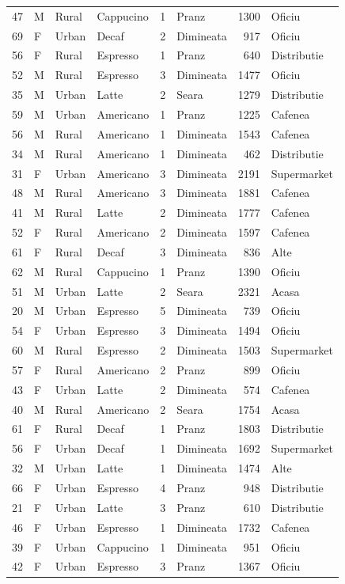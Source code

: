 \documentclass[12pt,a4paper]{report}
\begin{document}
\begin{appendices}
\begin{longtable}{rlllrlrl}
47 & M & Rural & Cappucino & 1 & Pranz & 1300 & Oficiu \\
69 & F & Urban & Decaf & 2 & Dimineata & 917 & Oficiu \\
56 & F & Rural & Espresso & 1 & Pranz & 640 & Distributie \\
52 & M & Rural & Espresso & 3 & Dimineata & 1477 & Oficiu \\
35 & M & Urban & Latte & 2 & Seara & 1279 & Distributie \\
59 & M & Urban & Americano & 1 & Pranz & 1225 & Cafenea \\
56 & M & Rural & Americano & 1 & Dimineata & 1543 & Cafenea \\
34 & M & Rural & Americano & 1 & Dimineata & 462 & Distributie \\
31 & F & Urban & Americano & 3 & Dimineata & 2191 & Supermarket \\
48 & M & Rural & Americano & 3 & Dimineata & 1881 & Cafenea \\
41 & M & Rural & Latte & 2 & Dimineata & 1777 & Cafenea \\
52 & F & Rural & Americano & 2 & Dimineata & 1597 & Cafenea \\
61 & F & Rural & Decaf & 3 & Dimineata & 836 & Alte \\
62 & M & Rural & Cappucino & 1 & Pranz & 1390 & Oficiu \\
51 & M & Urban & Latte & 2 & Seara & 2321 & Acasa \\
20 & M & Urban & Espresso & 5 & Dimineata & 739 & Oficiu \\
54 & F & Urban & Espresso & 3 & Dimineata & 1494 & Oficiu \\
60 & M & Rural & Espresso & 2 & Dimineata & 1503 & Supermarket \\
57 & F & Rural & Americano & 2 & Pranz & 899 & Oficiu \\
43 & F & Urban & Latte & 2 & Dimineata & 574 & Cafenea \\
40 & M & Rural & Americano & 2 & Seara & 1754 & Acasa \\
61 & F & Rural & Decaf & 1 & Pranz & 1803 & Distributie \\
56 & F & Urban & Decaf & 1 & Dimineata & 1692 & Supermarket \\
32 & M & Urban & Latte & 1 & Dimineata & 1474 & Alte \\
66 & F & Urban & Espresso & 4 & Pranz & 948 & Distributie \\
21 & F & Urban & Latte & 3 & Pranz & 610 & Distributie \\
46 & F & Urban & Espresso & 1 & Dimineata & 1732 & Cafenea \\
39 & F & Urban & Cappucino & 1 & Dimineata & 951 & Oficiu \\
42 & F & Urban & Espresso & 3 & Pranz & 1367 & Oficiu \\
\end{longtable}

\end{appendices}
\end{document}
